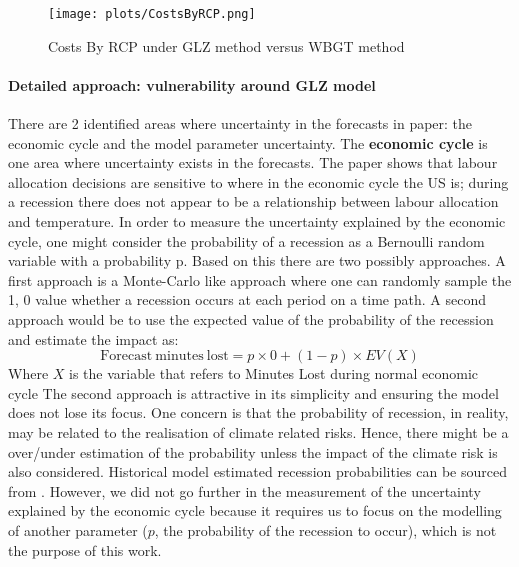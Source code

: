 \documentclass[a4paper,11pt]{extarticle} %
\begin{document}
\begin{figure}[h]
    \centering
    \texttt{[image: plots/CostsByRCP.png]}
    \caption{Costs By RCP under GLZ method versus WBGT method}
    \label{fig:CostsByRCP}
\end{figure}



\paragraph{Detailed approach: vulnerability around GLZ model}

There are 2 identified areas where uncertainty in the forecasts in \cite{TemperatureAndWork:2021} paper: the economic cycle and the model parameter uncertainty.
\newline
The \textbf{economic cycle} is one area where uncertainty exists in the forecasts.
The paper shows that labour allocation decisions are sensitive to where in the economic cycle the US is; during a recession there does not appear to be a relationship between labour allocation and temperature. In order to measure the uncertainty explained by the economic cycle, one might consider the probability of a recession as a Bernoulli random variable with a probability p. Based on this there are two possibly approaches. A first approach is a Monte-Carlo like approach where one can randomly sample the 1, 0 value whether a recession occurs at each period on a time path. A second approach would be to use the expected value of the probability of the recession and estimate the impact as:
\begin{equation}
    \label{Eq:economiccycle}
        \mathrm{Forecast \ minutes \ lost} = p \times 0 + (1-p) \times EV(X)
\end{equation}
Where $X$ is the variable that refers to Minutes Lost during normal economic cycle
The second approach is attractive in its simplicity and ensuring the model does not lose its focus.
One concern is that the probability of recession, in reality, may be related to the realisation of climate related risks. Hence, there might be a over/under estimation of the probability unless the impact of the climate risk is also considered. Historical model estimated recession probabilities can be sourced from \cite{SmoothedU.S.RecessionProbabilities:2022}. However, we did not go further in the measurement of the uncertainty explained by the economic cycle because it requires us to focus on the modelling of another parameter ($p$, the probability of the recession to occur), which is not the purpose of this work.
\end{document}
